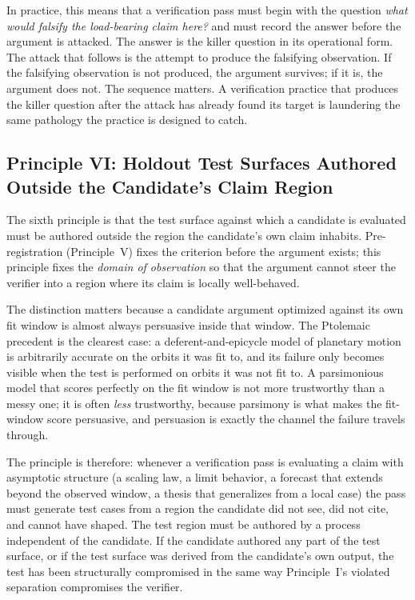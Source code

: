 \documentclass[11pt]{article}
\begin{document}
In practice, this means that a verification pass must begin with the question \emph{what would falsify the load-bearing claim here?} and must record the answer before the argument is attacked. The answer is the killer question in its operational form. The attack that follows is the attempt to produce the falsifying observation. If the falsifying observation is not produced, the argument survives; if it is, the argument does not. The sequence matters. A verification practice that produces the killer question after the attack has already found its target is laundering the same pathology the practice is designed to catch.

\subsection{Principle VI: Holdout Test Surfaces Authored Outside the Candidate's Claim Region}

The sixth principle is that the test surface against which a candidate is evaluated must be authored outside the region the candidate's own claim inhabits. Pre-registration (Principle~V) fixes the criterion before the argument exists; this principle fixes the \emph{domain of observation} so that the argument cannot steer the verifier into a region where its claim is locally well-behaved.

The distinction matters because a candidate argument optimized against its own fit window is almost always persuasive inside that window. The Ptolemaic precedent is the clearest case: a deferent-and-epicycle model of planetary motion is arbitrarily accurate on the orbits it was fit to, and its failure only becomes visible when the test is performed on orbits it was not fit to. A parsimonious model that scores perfectly on the fit window is not more trustworthy than a messy one; it is often \emph{less} trustworthy, because parsimony is what makes the fit-window score persuasive, and persuasion is exactly the channel the failure travels through.

The principle is therefore: whenever a verification pass is evaluating a claim with asymptotic structure (a scaling law, a limit behavior, a forecast that extends beyond the observed window, a thesis that generalizes from a local case) the pass must generate test cases from a region the candidate did not see, did not cite, and cannot have shaped. The test region must be authored by a process independent of the candidate. If the candidate authored any part of the test surface, or if the test surface was derived from the candidate's own output, the test has been structurally compromised in the same way Principle~I's violated separation compromises the verifier.
\end{document}
